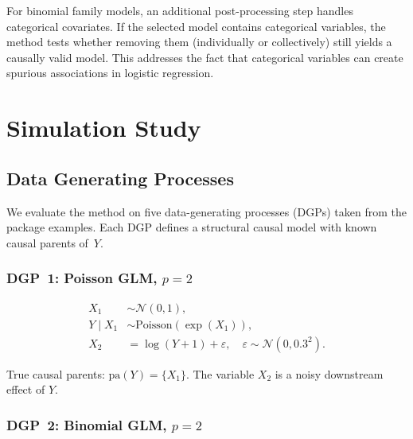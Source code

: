 \documentclass[11pt,a4paper]{article}
\newcommand{\pa}{\mathrm{pa}}
\begin{document}
For binomial family models, an additional post-processing step handles categorical covariates. If the selected model contains categorical variables, the method tests whether removing them (individually or collectively) still yields a causally valid model. This addresses the fact that categorical variables can create spurious associations in logistic regression.

\section{Simulation Study}

\subsection{Data Generating Processes}

We evaluate the method on five data-generating processes (DGPs) taken from the package examples. Each DGP defines a structural causal model with known causal parents of~$Y$.

\subsubsection{DGP~1: Poisson GLM, $p = 2$}

\begin{center}
\end{center}

\begin{align}
X_1 &\sim \mathcal{N}(0, 1), \\
Y \mid X_1 &\sim \text{Poisson}(\exp(X_1)), \\
X_2 &= \log(Y + 1) + \varepsilon, \quad \varepsilon \sim \mathcal{N}(0, 0.3^2).
\end{align}

True causal parents: $\pa(Y) = \{X_1\}$. The variable $X_2$ is a noisy downstream effect of $Y$.

\subsubsection{DGP~2: Binomial GLM, $p = 2$}
\end{document}
